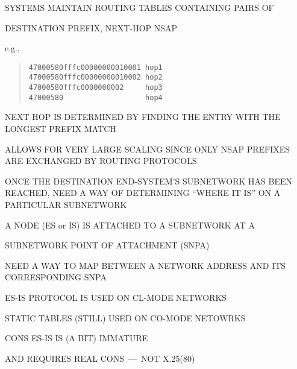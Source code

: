 \begin{bwslide}

\begin{nrtc}
\item	SYSTEMS MAINTAIN ROUTING TABLES CONTAINING PAIRS OF
    \begin{nrtc}
    \item	DESTINATION PREFIX, NEXT-HOP NSAP
    \end{nrtc}
    e.g.,
\begin{quote}\small\begin{verbatim}
47000580fffc00000000010001 hop1
47000580fffc00000000010002 hop2
47000580fffc0000000002     hop3
47000580                   hop4
\end{verbatim}\end{quote}

\item	NEXT HOP IS DETERMINED BY FINDING THE ENTRY WITH THE LONGEST PREFIX
	MATCH 

\item	ALLOWS FOR VERY LARGE SCALING SINCE ONLY NSAP PREFIXES ARE EXCHANGED
	BY ROUTING PROTOCOLS

\item	ONCE THE DESTINATION END-SYSTEM'S SUBNETWORK HAS BEEN REACHED,
	NEED A WAY OF DETERMINING ``WHERE IT IS'' ON A PARTICULAR
	SUBNETWORK
\end{nrtc}
\end{bwslide}


\begin{bwslide}

\begin{nrtc}
\item	A NODE (ES or IS) IS ATTACHED TO A SUBNETWORK AT A
    \begin{nrtc}
    \item	SUBNETWORK POINT OF ATTACHMENT (SNPA)
    \end{nrtc}

\item	NEED A WAY TO MAP BETWEEN A NETWORK ADDRESS
	AND ITS CORRESPONDING SNPA

\item	ES-IS PROTOCOL IS USED ON CL-MODE NETWORKS

\item	STATIC TABLES (STILL) USED ON CO-MODE NETOWRKS
    \begin{nrtc}
    \item	CONS ES-IS IS (A BIT) IMMATURE

    \item	AND REQUIRES REAL CONS~---~NOT X.25(80)
    \end{nrtc}
\end{nrtc}
\end{bwslide}


